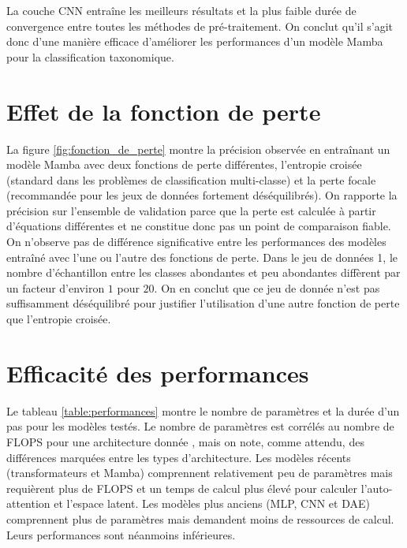 La couche CNN entraîne les meilleurs résultats et la plus faible durée de convergence entre toutes
les méthodes de pré-traitement. On conclut qu'il s'agit donc d'une manière efficace d'améliorer les
performances d'un modèle Mamba pour la classification taxonomique.

\section{Effet de la fonction de perte}
\label{sec:f_perte_ch_4}
La figure \ref{fig:fonction_de_perte} montre la précision observée en entraînant un modèle Mamba
avec deux fonctions de perte différentes, l'entropie croisée (standard dans les problèmes de
classification multi-classe) et la perte focale (recommandée pour les jeux de données fortement
déséquilibrés). On rapporte la précision sur l'ensemble de validation parce que la perte est
calculée à partir d'équations différentes et ne constitue donc pas un point de comparaison fiable.
On n'observe pas de différence significative entre les performances des modèles entraîné avec l'une
ou l'autre des fonctions de perte. Dans le jeu de données 1, le nombre d'échantillon entre les
classes abondantes et peu abondantes diffèrent par un facteur d'environ $1$ pour $20$. On en conclut
que ce jeu de donnée n'est pas suffisamment déséquilibré pour justifier l'utilisation d'une autre
fonction de perte que l'entropie croisée.

\section{Efficacité des performances}
Le tableau \ref{table:performances} montre le nombre de paramètres et la durée d'un pas pour les
modèles testés. Le nombre de paramètres est corrélés au nombre de FLOPS pour une architecture donnée
\cite{kaplan2020}, mais on note, comme attendu, des différences marquées entre les types
d'architecture. Les modèles récents (transformateurs et Mamba) comprennent relativement peu de
paramètres mais requièrent plus de FLOPS et un temps de calcul plus élevé pour calculer
l'auto-attention et l'espace latent. Les modèles plus anciens (MLP, CNN et DAE) comprennent plus de
paramètres mais demandent moins de ressources de calcul. Leurs performances sont néanmoins
inférieures.

